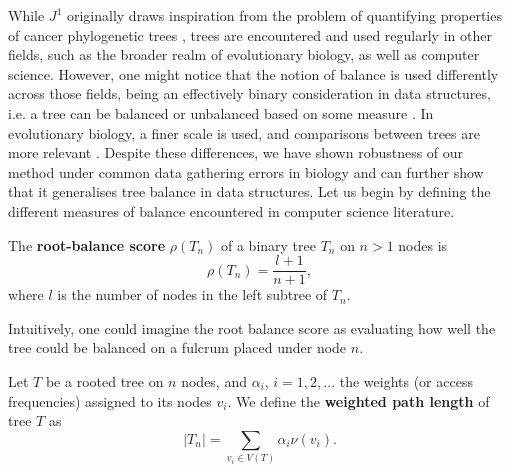 While $J^1$ originally draws inspiration from the problem of quantifying properties of cancer phylogenetic trees \cite{noble_spatial_2022}, trees are encountered and used regularly in other fields, such as the broader realm of evolutionary biology, as well as computer science. However, one might notice that the notion of balance is used differently across those fields, being an effectively binary consideration in data structures, i.e. a tree can be balanced or unbalanced based on some measure \cite{nievergelt_binary_nodate}. In evolutionary biology, a finer scale is used, and comparisons between trees are more relevant \cite{mir_new_2013, mir_sound_2018, fischer_tree_2021}. Despite these differences, we have shown robustness of our method under common data gathering errors in biology \cite{lemant_robust_2021} and can further show that it generalises tree balance in data structures. Let us begin by defining the different measures of balance encountered in computer science literature.

\begin{definition}
    The \textbf{root-balance score} $\rho(T_n)$ of a binary tree $T_n$ on $n > 1$ nodes is
    \begin{equation}\label{defrootbalscore}
        \rho(T_n) = \frac{l+1}{n+1},
    \end{equation}
    where $l$ is the number of nodes in the left subtree of $T_n$.
\end{definition}
Intuitively, one could imagine the root balance score as evaluating how well the tree could be balanced on a fulcrum placed under node $n$.

\begin{definition}
    Let $T$ be a rooted tree on $n$ nodes, and $\alpha_i$, $i=1,2,...$ the weights (or access frequencies) assigned to its nodes $v_i$. We define the \textbf{weighted path length} of tree $T$ as
    \begin{equation}\label{wpathdef}
        |T_n| = \sum_{v_i \in V(T)} \alpha_i \nu(v_i).
    \end{equation}
\end{definition}


